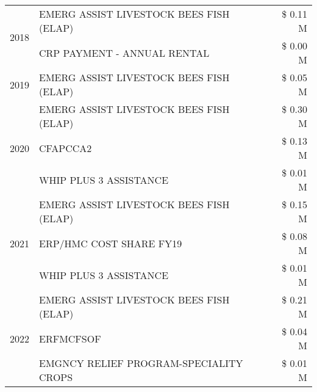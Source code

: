 \begin{tabular}{llr}
\cline{1-3}
\multirow[t]{2}{*}{2018} & EMERG ASSIST LIVESTOCK BEES FISH (ELAP) & \$ 0.11 M \\
 & CRP PAYMENT - ANNUAL RENTAL & \$ 0.00 M \\
\cline{1-3}
2019 & EMERG ASSIST LIVESTOCK BEES FISH (ELAP) & \$ 0.05 M \\
\cline{1-3}
\multirow[t]{3}{*}{2020} & EMERG ASSIST LIVESTOCK BEES FISH (ELAP) & \$ 0.30 M \\
 & CFAPCCA2 & \$ 0.13 M \\
 & WHIP PLUS 3 ASSISTANCE & \$ 0.01 M \\
\cline{1-3}
\multirow[t]{3}{*}{2021} & EMERG ASSIST LIVESTOCK BEES FISH (ELAP) & \$ 0.15 M \\
 & ERP/HMC COST SHARE FY19 & \$ 0.08 M \\
 & WHIP PLUS 3 ASSISTANCE & \$ 0.01 M \\
\cline{1-3}
\multirow[t]{3}{*}{2022} & EMERG ASSIST LIVESTOCK BEES FISH (ELAP) & \$ 0.21 M \\
 & ERFMCFSOF & \$ 0.04 M \\
 & EMGNCY RELIEF PROGRAM-SPECIALITY CROPS & \$ 0.01 M \\
\cline{1-3}
\bottomrule
\end{tabular}
